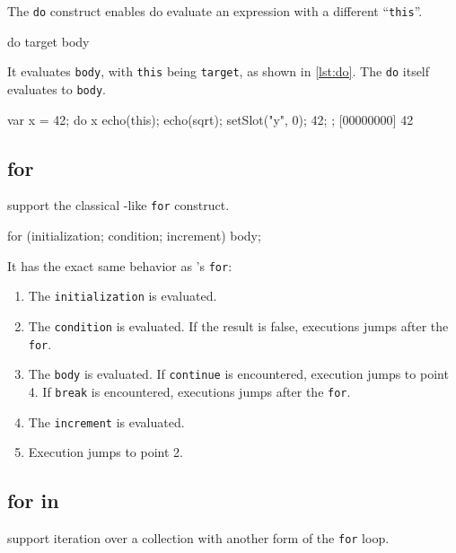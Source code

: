 The \lstinline|do| construct enables do evaluate an expression with a
different ``\lstinline|this|''.

\begin{urbiscript}[frame=, backgroundcolor=, ]
  do target
  {
    body
  }
\end{urbiscript}

It evaluates \lstinline|body|, with \lstinline|this| being
\lstinline|target|, as shown in \autoref{lst:do}.  The \lstinline|do| itself
evaluates to \lstinline|body|.

\begin{urbiscript}[caption=Using \lstinline|do|, label=lst:do,
  float=\floatpos]
  var x = 42;
  do x
  {
    echo(this);
    echo(sqrt);
    setSlot("y", 0);
    42;
  };
  [00000000] 42
\end{urbiscript}

\subsection{for}

\us support the classical \C-like \lstinline|for| construct.

\begin{urbiscript}[frame=, backgroundcolor=, ]
  for (initialization; condition; increment)
    body;
\end{urbiscript}

It has the exact same behavior as \C's \lstinline|for|:

\begin{enumerate}
\item The \lstinline|initialization| is evaluated.
\item The \lstinline|condition| is evaluated. If the result is false,
  executions jumps after the \lstinline|for|.
\item The \lstinline|body| is evaluated. If \lstinline|continue| is
  encountered, execution jumps to point 4. If \lstinline|break| is
  encountered, executions jumps after the \lstinline|for|.
\item The \lstinline|increment| is evaluated.
\item Execution jumps to point 2.
\end{enumerate}

\subsection{for in}

\us support iteration over a collection with another form of the
\lstinline|for| loop.

